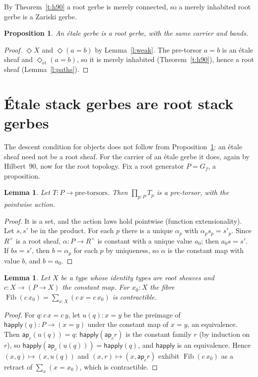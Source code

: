 \documentclass[11pt]{amsart}
\newtheorem{lemma}[theorem]{Lemma}
\newtheorem{proposition}[theorem]{Proposition}
\theoremstyle{definition}
\theoremstyle{remark}
\newcommand{\Fib}{\operatorname{Fib}}
\newcommand{\happly}{\mathsf{happly}}
\newcommand{\ap}{\mathsf{ap}}
\newcommand{\close}{\Diamond}
\newcommand{\closeE}{\Diamond_{\mathrm{et}}}
\newcommand{\Rx}{R^\times}
\begin{document}
By Theorem~\ref{t:h90} a root gerbe is merely connected, so a merely
inhabited root gerbe is a Zariski gerbe.

\begin{proposition}\label{p:root}
An \'etale gerbe is a root gerbe, with the same carrier and bands.
\end{proposition}
\begin{proof}
$\close X$ and $\close(a=b)$ by Lemma~\ref{l:weak}. The pre-torsor $a=b$ is
an \'etale sheaf and $\closeE(a=b)$, so it is merely inhabited
(Theorem~\ref{t:h90}), hence a root sheaf (Lemma~\ref{l:paths}).
\end{proof}

\section{\'Etale stack gerbes are root stack gerbes}

The descent condition for objects does not follow from
Proposition~\ref{p:root}: an \'etale sheaf need not be a root sheaf. For
the carrier of an \'etale gerbe it does, again by Hilbert~90, now for the
root topology. Fix a root generator $P=G_f$, a proposition.

\begin{lemma}\label{l:pi}
Let $T:P\to\text{pre-torsors}$. Then $\prod_{p:P}T_p$ is a pre-torsor, with
the pointwise action.
\end{lemma}
\begin{proof}
It is a set, and the action laws hold pointwise (function
extensionality). Let $s,s'$ be in the product. For each $p$ there is a
unique $\alpha_p$ with $\alpha_p s_p=s'_p$. Since $\Rx$ is a root sheaf,
$\alpha:P\to\Rx$ is constant with a unique value $a_0$; then $a_0s=s'$. If
$bs=s'$, then $b=\alpha_p$ for each $p$ by uniqueness, so $\alpha$ is the
constant map with value $b$, and $b=a_0$.
\end{proof}

\begin{lemma}\label{l:emb}
Let $X$ be a type whose identity types are root sheaves and $c:X\to(P\to
X)$ the constant map. For $x_0:X$ the fibre
$\Fib(c\,x_0)=\sum_{x:X}(c\,x=c\,x_0)$ is contractible.
\end{lemma}
\begin{proof}
For $q:c\,x=c\,y$, let $u(q):x=y$ be the preimage of $\happly(q):P\to(x=y)$
under the constant map of $x=y$, an equivalence. Then $\ap_c(u(q))=q$:
$\happly(\ap_c r)$ is the constant family $r$ (by induction on $r$), so
$\happly(\ap_c(u(q)))=\happly(q)$, and $\happly$ is an equivalence. Hence
$(x,q)\mapsto(x,u(q))$ and $(x,r)\mapsto(x,\ap_c r)$ exhibit $\Fib(c\,x_0)$
as a retract of $\sum_x(x=x_0)$, which is contractible.
\end{proof}
\end{document}
